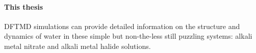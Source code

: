 

%

\paragraph{This thesis}
%
DFTMD simulations can provide detailed information on the structure and dynamics  
of water in these simple but non-the-less still puzzling systems: alkali metal nitrate and alkali metal halide solutions\cite{Mizoguchi1998}.

